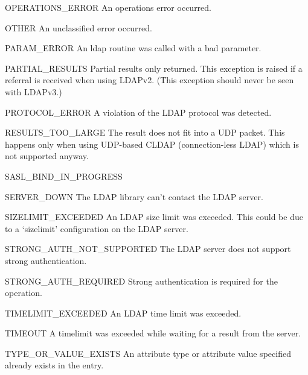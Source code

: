 \begin{excdesc}{OPERATIONS_ERROR}
An operations error occurred.
\end{excdesc}
\begin{excdesc}{OTHER}
An unclassified error occurred.
\end{excdesc}
\begin{excdesc}{PARAM_ERROR}
An ldap routine was called with a bad parameter.
\end{excdesc}
\begin{excdesc}{PARTIAL_RESULTS}
Partial results only returned. This exception is raised if
a referral is received when using LDAPv2.
(This exception should never be seen with LDAPv3.)
\end{excdesc}
\begin{excdesc}{PROTOCOL_ERROR}
A violation of the LDAP protocol was detected.
\end{excdesc}
\begin{excdesc}{RESULTS_TOO_LARGE}
The result does not fit into a UDP packet. This happens only when using
UDP-based CLDAP (connection-less LDAP) which is not supported anyway.
\end{excdesc}
\begin{excdesc}{SASL_BIND_IN_PROGRESS}

\end{excdesc}
\begin{excdesc}{SERVER_DOWN}
The  LDAP  library  can't  contact the LDAP server.
\end{excdesc}
\begin{excdesc}{SIZELIMIT_EXCEEDED}
An LDAP size limit was exceeded.
This could be due to a `sizelimit' configuration on the LDAP server.
\end{excdesc}
\begin{excdesc}{STRONG_AUTH_NOT_SUPPORTED}
The LDAP server does not support strong authentication.
\end{excdesc}
\begin{excdesc}{STRONG_AUTH_REQUIRED}
Strong authentication is required  for the operation.
\end{excdesc}
\begin{excdesc}{TIMELIMIT_EXCEEDED}
An LDAP time limit was exceeded.
\end{excdesc}
\begin{excdesc}{TIMEOUT}
A timelimit was exceeded while waiting for a result from the server.
\end{excdesc}
\begin{excdesc}{TYPE_OR_VALUE_EXISTS}
An  attribute  type or attribute value specified already 
exists in the entry.
\end{excdesc}
